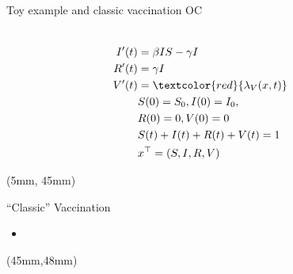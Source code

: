 \begin{frame}{Toy example and classic vaccination OC}
\begin{textblock*}{65mm}
{\begin{equation*}
\begin{aligned}
                   \\
                   I'(t) &=  \beta IS - \gamma I
                   \\
                   R'(t) & = \gamma I
                   \\
                   V'(t) & = \textcolor{red}{\lambda_V(x,t)}
                   \\
                   & S(0) = S_0, I(0)=I_0,
                   \\
                   &R(0)=0, V(0)=0
                   \\
                   & S(t) + I(t) + R(t) + V(t)= 1
                   \\
                   & x^{\top}=(S,I,R,V)
                \end{aligned}
            \end{equation*}
        }
     \end{textblock*}
     \begin{textblock*}{28mm}(5mm, 45mm)
        \begin{block}{``Classic'' Vaccination}
            \begin{itemize}
                \item

            \end{itemize}
        \end{block}
     \end{textblock*}
     \begin{textblock*}{80mm}(45mm,48mm)
     \end{textblock*}
 \end{frame}
